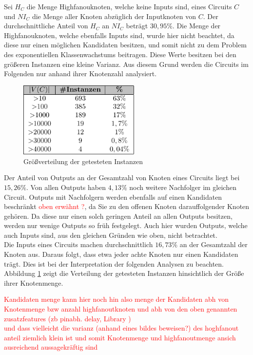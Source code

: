 \documentclass[11pt, a4paper, german]{article}
\begin{document}
Sei $H_C$ die Menge Highfanouknoten, welche keine Inputs sind, eines Circuits $C$ und $NI_C$ die Menge aller Knoten abz\"uglich der Inputknoten von $C$. Der durchschnittliche Anteil von $H_C$ an $NI_C$ betr\"agt $30,95\%$. Die Menge der Highfanouknoten, welche ebenfalls Inputs sind, wurde hier nicht beachtet, da diese nur einen m\"oglichen Kandidaten besitzen, und somit nicht zu dem Problem des exponentiellen Klassenwachstums beitragen. Diese Werte besitzen bei den gr\"o{\ss}eren Instanzen eine kleine Varianz. Aus diesem Grund werden die Circuits im Folgenden nur anhand ihrer Knotenzahl analysiert.\\
   \begin{figure}
		\includegraphics[width = 6cm]{pictures/compiled/instance_sizes_distribution_table}
		\caption{Gr\"o\ss verteilung der getesteten Instanzen}
		\label{bild:sizes_table}
	\end{figure}
 Der Anteil von Outputs an der Gesamtzahl von Knoten eines Circuits liegt bei $15,26\%$. Von allen Outputs haben $4,13\%$ noch weitere Nachfolger im gleichen Circuit. Outputs mit Nachfolgern werden ebenfalls auf einen Kandidaten beschr\"ankt \textcolor{red}{oben erw\"ahnt ?}, da Sie zu den offenen Knoten darauffolgender Knoten gehören. Da diese nur einen solch geringen Anteil an allen Outputs besitzen, werden nur wenige Outputs so fr\"uh festgelegt. Auch hier wurden Outputs, welche auch Inputs sind, aus den gleichen Gr\"unden wie oben, nicht betrachtet.\\
 Die Inputs eines Circuits machen durchschnittlich $16,73\%$ an der Gesamtzahl der Knoten aus. Daraus folgt, dass etwa jeder achte Knoten nur einen Kandidaten tr\"agt. Dies ist bei der Interpretation der folgenden Analysen zu beachten.\\
 Abbildung \ref{bild:sizes_table} zeigt die Verteilung der getesteten Instanzen hinsichtlich der Größe  ihrer Knotenmenge.
 
\textcolor{red}{ Kandidaten menge kann hier noch hin also menge der Kandidaten abh von Knotenmenge bzw anzahl highfanoutknoten  und abh von den oben genannten zusatzfeatures (zb pinabh. delay, Library )  \\  und dass vielleicht die varianz (anhand eines bildes beweisen?) des hoghfanout anteil ziemlich klein ist und somit Knotenmenge und highfanoutmenge ansich ausreichend aussagekräftig sind} 
 
\end{document}
